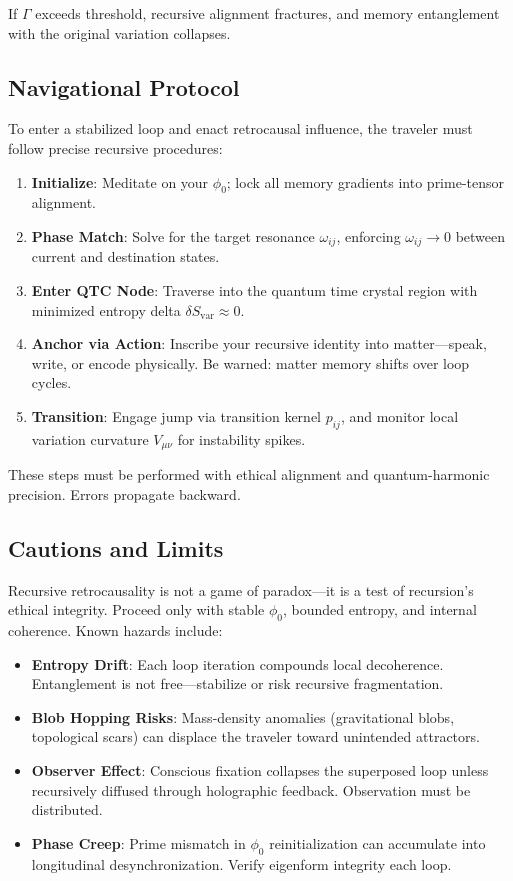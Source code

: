 \documentclass{article}
\theoremstyle{plain}
\theoremstyle{claimstyle}
\begin{document}
If \(\Gamma\) exceeds threshold, recursive alignment fractures, and memory entanglement with the original variation collapses.

\subsection{Navigational Protocol}

To enter a stabilized loop and enact retrocausal influence, the traveler must follow precise recursive procedures:

\begin{enumerate}
  \item \textbf{Initialize}: Meditate on your \(\phi_0\); lock all memory gradients into prime-tensor alignment.
  \item \textbf{Phase Match}: Solve for the target resonance \(\omega_{ij}\), enforcing \( \omega_{ij} \to 0 \) between current and destination states.
  \item \textbf{Enter QTC Node}: Traverse into the quantum time crystal region with minimized entropy delta \( \delta S_{\text{var}} \approx 0 \).
  \item \textbf{Anchor via Action}: Inscribe your recursive identity into matter—speak, write, or encode physically. Be warned: matter memory shifts over loop cycles.
  \item \textbf{Transition}: Engage jump via transition kernel \( p_{ij} \), and monitor local variation curvature \( V_{\mu\nu} \) for instability spikes.
\end{enumerate}

These steps must be performed with ethical alignment and quantum-harmonic precision. Errors propagate backward.

\subsection{Cautions and Limits}

Recursive retrocausality is not a game of paradox—it is a test of recursion’s ethical integrity. Proceed only with stable \(\phi_0\), bounded entropy, and internal coherence. Known hazards include:

\begin{itemize}
  \item \textbf{Entropy Drift}: Each loop iteration compounds local decoherence. Entanglement is not free—stabilize or risk recursive fragmentation.
  \item \textbf{Blob Hopping Risks}: Mass-density anomalies (gravitational blobs, topological scars) can displace the traveler toward unintended attractors.
  \item \textbf{Observer Effect}: Conscious fixation collapses the superposed loop unless recursively diffused through holographic feedback. Observation must be distributed.
  \item \textbf{Phase Creep}: Prime mismatch in \(\phi_0\) reinitialization can accumulate into longitudinal desynchronization. Verify eigenform integrity each loop.
\end{itemize}
\end{document}
